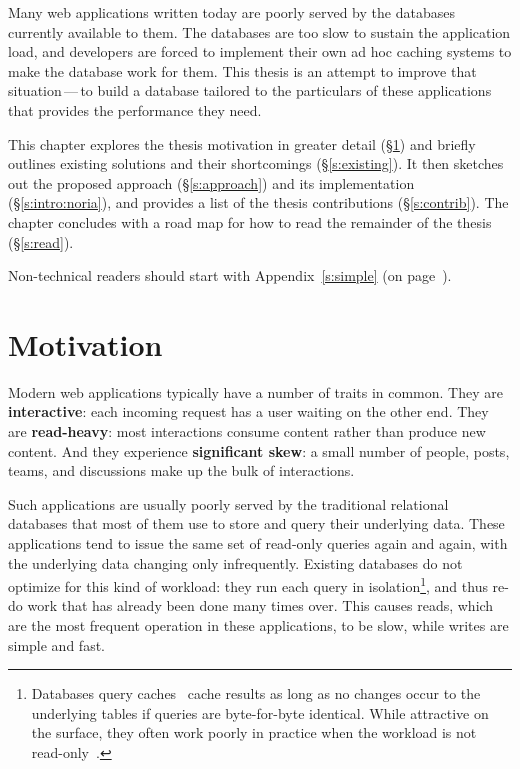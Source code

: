 Many web applications written today are poorly served by the databases currently
available to them. The databases are too slow to sustain the application load,
and developers are forced to implement their own ad hoc caching systems to make
the database work for them. This thesis is an attempt to improve that
situation\,---\,to build a database tailored to the particulars of these
applications that provides the performance they need.

This chapter explores the thesis motivation in greater detail
(\S\ref{s:motivation}) and briefly outlines existing solutions and their
shortcomings (\S\ref{s:existing}). It then sketches out the proposed approach
(\S\ref{s:approach}) and its implementation (\S\ref{s:intro:noria}), and
provides a list of the thesis contributions (\S\ref{s:contrib}). The chapter
concludes with a road map for how to read the remainder of the thesis
(\S\ref{s:read}).

Non-technical readers should start with Appendix~\ref{s:simple} (on
page~\pageref{s:simple}).

\section{Motivation}
\label{s:motivation}

Modern web applications typically have a number of traits in common. They are
\textbf{interactive}: each incoming request has a user waiting on the other end.
They are \textbf{read-heavy}: most interactions consume content rather than
produce new content. And they experience \textbf{significant skew}: a small
number of people, posts, teams, and discussions make up the bulk of
interactions.

Such applications are usually poorly served by the traditional relational
databases that most of them use to store and query their underlying data. These
applications tend to issue the same set of read-only queries again and again,
with the underlying data changing only infrequently. Existing databases do not
optimize for this kind of workload: they run each query in
isolation\footnote{Databases query caches~\cite{mysql-query-cache,
pgpool-query-cache} cache results as long as no changes occur to the underlying
tables if queries are byte-for-byte identical. While attractive on the surface,
they often work poorly in practice when the workload is not
read-only~\cite{mysql-query-cache-nope,pgpool-query-cache}.}, and thus re-do
work that has already been done many times over. This causes reads, which are the
most frequent operation in these applications, to be slow, while writes are
simple and fast.

